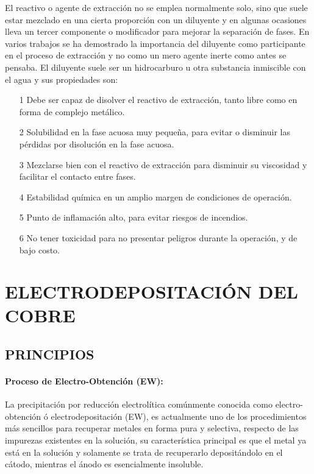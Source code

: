 El reactivo o agente de extracci\'on no se emplea normalmente solo, sino que suele estar mezclado en una cierta proporci\'on con un diluyente y en algunas ocasiones lleva un tercer componente o modificador para mejorar la separaci\'on de fases.  En varios trabajos se ha demostrado la importancia del diluyente como participante en el proceso de extracci\'on y no como un mero agente inerte como antes se pensaba.  El diluyente suele ser un hidrocarburo u otra substancia inmiscible con el agua y sus propiedades son:
\begin{itemize}
 \item[1] Debe ser capaz de disolver el reactivo de extracci\'on, tanto libre como en forma de complejo met\'alico.
 \item[2] Solubilidad en la fase acuosa muy peque\~na, para evitar o disminuir las p\'erdidas por disoluci\'on en la fase acuosa.
 \item[3] Mezclarse bien con el reactivo de extracci\'on para disminuir su viscosidad y facilitar el contacto entre fases.
 \item[4] Estabilidad qu\'imica en un amplio margen de condiciones de operaci\'on.
 \item[5] Punto de inflamaci\'on alto, para evitar riesgos de incendios.
 \item[6] No tener toxicidad para no presentar peligros durante la operaci\'on, y de bajo costo.
\end{itemize}

\section{ELECTRODEPOSITACI\'ON DEL COBRE}

\subsection{PRINCIPIOS}
\paragraph{Proceso de Electro-Obtenci\'on (EW):} 
La precipitaci\'on por reducci\'on electrol\'itica com\'unmente conocida como electro-obtenci\'on \'o electrodepositaci\'on (EW), es actualmente uno de los procedimientos m\'as sencillos para recuperar metales en forma pura y selectiva, respecto de las impurezas existentes en la soluci\'on, su característica principal es que el metal ya est\'a en la soluci\'on y solamente se trata de recuperarlo deposit\'andolo en el c\'atodo, mientras el \'anodo es esencialmente insoluble.

